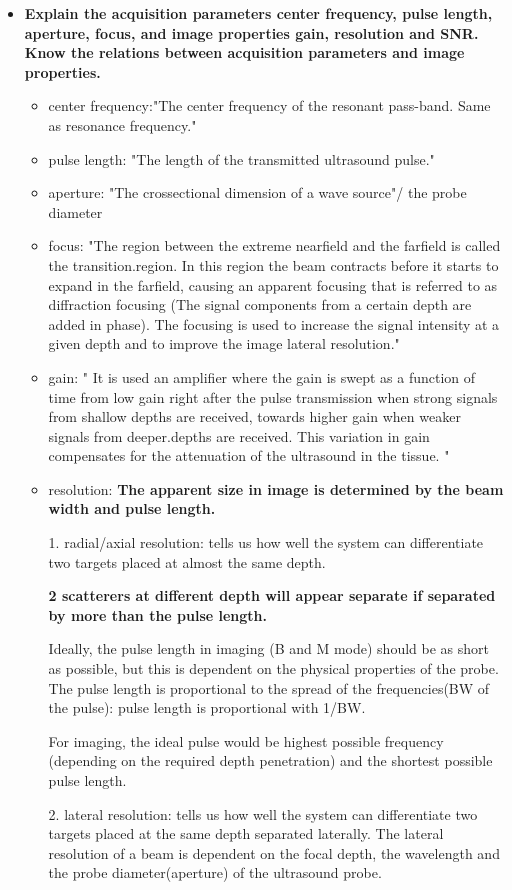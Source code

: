 \documentclass[10pt,a4paper,noendnumber=true]{scrartcl}
\begin{document}
\begin{itemize}
\item \textbf{Explain the acquisition parameters center frequency, pulse length, aperture, focus, and image properties gain, resolution and SNR. Know the relations between acquisition parameters and image properties.}

\begin{itemize}
\item center frequency:"The center frequency of the resonant pass-band. Same as resonance frequency."
\item pulse length: "The length of the transmitted ultrasound pulse."
\item aperture: "The crossectional dimension of a wave source"/ the probe diameter
\item focus: "The region between the extreme nearfield and the farfield is called the transition.region. In this region the beam contracts before it starts to expand in the farfield, causing an apparent focusing that is referred to as diffraction focusing (The signal components from a certain depth are added in phase). The focusing is used to increase the signal intensity at a given depth and to improve the image lateral resolution."
\item gain: "
It is used an amplifier where the gain is swept as a function of time from low gain right after the pulse transmission when strong signals from shallow depths are received, towards higher gain when weaker signals from deeper.depths are received. This variation in gain compensates for the attenuation of the ultrasound in the tissue. "
\item resolution: 
\textbf{The apparent size in image is determined by the beam width and pulse length.}

1. radial/axial resolution: tells us how well the system can differentiate two targets placed at almost the same depth.

\textbf{2 scatterers at different depth will appear separate if separated by more than the pulse length.}

Ideally, the pulse length in imaging (B and M mode) should be as short as possible, but this is dependent on the physical properties of the probe. The pulse length is proportional to the spread of the frequencies(BW of the pulse): pulse length is proportional with 1/BW.

For imaging, the ideal pulse would be highest possible frequency (depending on the required depth penetration) and the shortest possible pulse length. 

2. lateral resolution: tells us how well the system can differentiate two targets placed at the same depth separated laterally. The lateral resolution of a beam is dependent on the focal depth, the wavelength and the probe diameter(aperture) of the ultrasound probe. 


\end{itemize}
\end{itemize}
\end{document}
